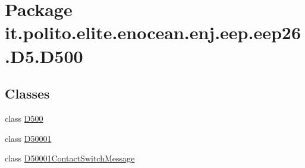 \hypertarget{namespaceit_1_1polito_1_1elite_1_1enocean_1_1enj_1_1eep_1_1eep26_1_1_d5_1_1_d500}{}\section{Package it.\+polito.\+elite.\+enocean.\+enj.\+eep.\+eep26.\+D5.\+D500}
\label{namespaceit_1_1polito_1_1elite_1_1enocean_1_1enj_1_1eep_1_1eep26_1_1_d5_1_1_d500}
\subsection*{Classes}
\begin{DoxyCompactItemize}
\item 
class \hyperlink{classit_1_1polito_1_1elite_1_1enocean_1_1enj_1_1eep_1_1eep26_1_1_d5_1_1_d500_1_1_d500}{D500}
\item 
class \hyperlink{classit_1_1polito_1_1elite_1_1enocean_1_1enj_1_1eep_1_1eep26_1_1_d5_1_1_d500_1_1_d50001}{D50001}
\item 
class \hyperlink{classit_1_1polito_1_1elite_1_1enocean_1_1enj_1_1eep_1_1eep26_1_1_d5_1_1_d500_1_1_d50001_contact_switch_message}{D50001\+Contact\+Switch\+Message}
\end{DoxyCompactItemize}

